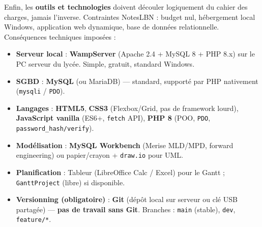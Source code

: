 \documentclass[11pt]{article}
\begin{document}
Enfin, les \textbf{outils et technologies} doivent découler logiquement du cahier des charges, jamais l'inverse. Contraintes NotesLBN : budget nul, hébergement local Windows, application web dynamique, base de données relationnelle. Conséquences techniques imposées :

\begin{itemize}
\item \textbf{Serveur local} : \textbf{WampServer} (Apache 2.4 + MySQL 8 + PHP 8.x) sur le PC serveur du lycée. Simple, gratuit, standard Windows.
\item \textbf{SGBD} : \textbf{MySQL} (ou MariaDB) — standard, supporté par PHP nativement (\texttt{mysqli} / \texttt{PDO}).
\item \textbf{Langages} : \textbf{HTML5}, \textbf{CSS3} (Flexbox/Grid, pas de framework lourd), \textbf{JavaScript vanilla} (ES6+, \texttt{fetch} API), \textbf{PHP 8} (POO, \texttt{PDO}, \texttt{password\_hash/verify}).
\item \textbf{Modélisation} : \textbf{MySQL Workbench} (Merise MLD/MPD, forward engineering) ou papier/crayon + \texttt{draw.io} pour UML.
\item \textbf{Planification} : Tableur (LibreOffice Calc / Excel) pour le Gantt ; \texttt{GanttProject} (libre) si disponible.
\item \textbf{Versionning (obligatoire)} : \textbf{Git} (dépôt local sur serveur ou clé USB partagée) — \textbf{pas de travail sans Git}. Branches : \texttt{main} (stable), \texttt{dev}, \texttt{feature/*}.
\end{itemize}
\end{document}
